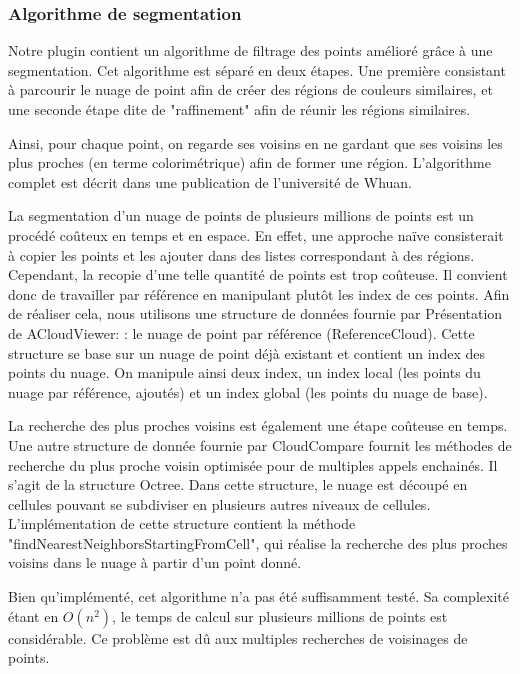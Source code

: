 \documentclass[12pt,titlepage,french]{article}
\begin{document}
\subsubsection{Algorithme de segmentation}

Notre plugin contient un algorithme de filtrage des points amélioré grâce à une segmentation. Cet algorithme est séparé en deux étapes. Une première consistant à parcourir le nuage de point afin de créer des régions de couleurs similaires, et une seconde étape dite de "raffinement" afin de réunir les régions similaires. \newline

Ainsi, pour chaque point, on regarde ses voisins en ne gardant que ses voisins les plus proches (en terme colorimétrique) afin de former une région. L'algorithme complet est décrit dans une publication de l'université de \cite{B01} Whuan. \newline

La segmentation d'un nuage de points de plusieurs millions de points est un procédé coûteux en temps et en espace. En effet, une approche naïve consisterait à copier les points et les ajouter dans des listes correspondant à des régions. Cependant, la recopie d'une telle quantité de points est trop coûteuse. Il convient donc de travailler par référence en manipulant plutôt les index de ces points.
Afin de réaliser cela, nous utilisons une structure de données fournie par  Présentation de ACloudViewer:
: le nuage de point par référence (ReferenceCloud). Cette structure se base sur un nuage de point déjà existant et contient un index des points du nuage. On manipule ainsi deux index, un index local (les points du nuage par référence, ajoutés) et un index global (les points du nuage de base). \newline

La recherche des plus proches voisins est également une étape coûteuse en temps. Une autre structure de donnée fournie par CloudCompare fournit les méthodes de recherche du plus proche voisin optimisée pour de multiples appels enchainés. Il s'agit de la structure Octree. Dans cette structure, le nuage est découpé en cellules pouvant se subdiviser en plusieurs autres niveaux de cellules. L'implémentation de cette structure contient la méthode "findNearestNeighborsStartingFromCell", qui réalise la recherche des plus proches voisins dans le nuage à partir d'un point donné. \newline

Bien qu'implémenté, cet algorithme n'a pas été suffisamment testé. Sa complexité étant en $O(n^{2})$, le temps de calcul sur plusieurs millions de points est considérable. Ce problème est dû aux multiples recherches de voisinages de points.
\end{document}

